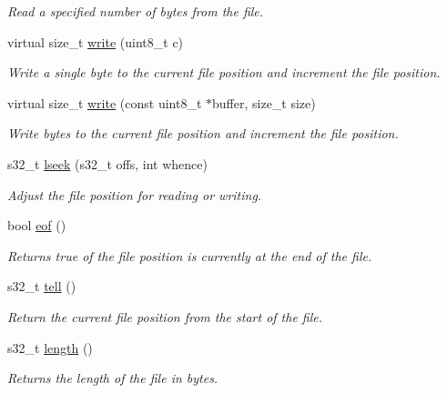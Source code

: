 \begin{DoxyCompactItemize}
\begin{DoxyCompactList}\small\item\em Read a specified number of bytes from the file. \end{DoxyCompactList}\item 
virtual size\+\_\+t \mbox{\hyperlink{class_spiffs_particle_file_a073ab7a5701a616959685c58a79e3391}{write}} (uint8\+\_\+t c)
\begin{DoxyCompactList}\small\item\em Write a single byte to the current file position and increment the file position. \end{DoxyCompactList}\item 
virtual size\+\_\+t \mbox{\hyperlink{class_spiffs_particle_file_ada3fa1782a929e32adab1c161f9d5eeb}{write}} (const uint8\+\_\+t $\ast$buffer, size\+\_\+t size)
\begin{DoxyCompactList}\small\item\em Write bytes to the current file position and increment the file position. \end{DoxyCompactList}\item 
s32\+\_\+t \mbox{\hyperlink{class_spiffs_particle_file_a5aeceaf038f055a50376a500dfb27856}{lseek}} (s32\+\_\+t offs, int whence)
\begin{DoxyCompactList}\small\item\em Adjust the file position for reading or writing. \end{DoxyCompactList}\item 
bool \mbox{\hyperlink{class_spiffs_particle_file_adc5b9b4d2447c8a3f1a63b40fd80e56f}{eof}} ()
\begin{DoxyCompactList}\small\item\em Returns true of the file position is currently at the end of the file. \end{DoxyCompactList}\item 
s32\+\_\+t \mbox{\hyperlink{class_spiffs_particle_file_ac1cb4c1027e6e635aff6864efedd0faa}{tell}} ()
\begin{DoxyCompactList}\small\item\em Return the current file position from the start of the file. \end{DoxyCompactList}\item 
s32\+\_\+t \mbox{\hyperlink{class_spiffs_particle_file_ab8b0e24661334106f1eef15bd92bf2e2}{length}} ()
\begin{DoxyCompactList}\small\item\em Returns the length of the file in bytes. \end{DoxyCompactList}\item 

\end{DoxyCompactItemize}
